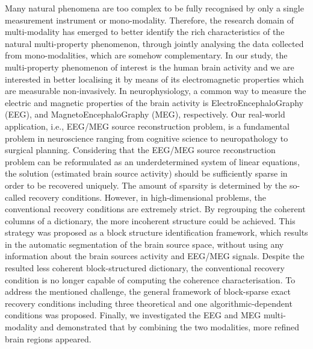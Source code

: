 Many natural phenomena are too complex to be fully recognised by only a single measurement instrument or mono-modality. Therefore, the research domain of multi-modality has emerged to better identify the rich characteristics of the natural multi-property phenomenon, through jointly analysing the data collected from mono-modalities, which are somehow complementary. 
In our study, the multi-property phenomenon of interest is the human brain activity and we are interested in better localising it by means of its electromagnetic properties which are measurable non-invasively. In neurophysiology, a common way to measure the electric and magnetic properties of the brain activity is ElectroEncephaloGraphy (EEG), and MagnetoEncephaloGraphy (MEG), respectively. Our real-world application, i.e., EEG/MEG source reconstruction problem, is a fundamental problem in neuroscience ranging from cognitive science to neuropathology to surgical planning. 
Considering that the EEG/MEG source reconstruction problem can be reformulated as an underdetermined system of linear equations, the solution (estimated brain source activity) should be sufficiently sparse in order to be recovered uniquely. The amount of sparsity is determined by the so-called recovery conditions. However, in high-dimensional problems, the conventional recovery conditions are extremely strict. By regrouping the coherent columns of a dictionary, the more incoherent structure could be achieved. This strategy was proposed as a block structure identification framework, which results in the automatic segmentation of the brain source space, without using any information about the brain sources activity and EEG/MEG signals. Despite the resulted less coherent block-structured dictionary, the conventional recovery condition is no longer capable of computing the coherence characterisation. To address the mentioned challenge, the general framework of block-sparse exact recovery conditions including three theoretical and one algorithmic-dependent conditions was proposed. Finally, we investigated the EEG and MEG multi-modality and demonstrated that by combining the two modalities, more refined brain regions appeared.
